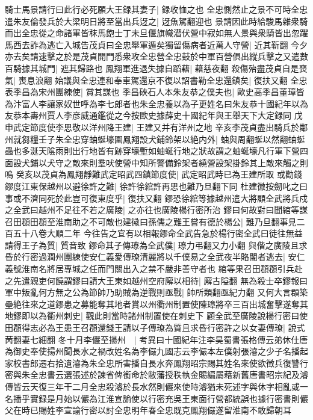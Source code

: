 騎士馬景請行曰此行必死願大王録其妻子|{
	録收恤之也}
全忠惻然止之景不可時全忠遣朱友倫發兵於大梁明日將至當出兵迓之|{
	迓魚駕翻迎也}
景請因此時給駿馬雜衆騎而出全忠從之命諸軍皆秣馬飽士丁未旦偃旗幟潜伏營中寂如無人景與衆騎皆出忽躍馬西去詐為逃亡入城告茂貞曰全忠舉軍遁矣獨留傷病者近萬人守營|{
	近其靳翻}
今夕亦去矣請速擊之於是茂貞開門悉衆攻全忠營全忠鼓於中軍百營俱出縱兵擊之又遣數百騎據其城門|{
	遮其歸路也}
鳳翔軍進退失據自蹈藉|{
	藉慈夜翻}
殺傷殆盡茂貞自是喪氣|{
	喪息浪翻}
始議與全忠連和奉車駕還京不復以詔書勒全忠還鎮矣|{
	復扶又翻}
全忠表季昌為宋州團練使|{
	賞其謀也}
季昌硤石人本朱友恭之僕夫也|{
	歐史高季昌董璋皆為汴富人李讓家奴世呼為李七郎者也朱全忠養以為子更姓名曰朱友恭十國紀年以為友恭本夀州賈人李彦威通鑑從之今按歐史據薛史十國紀年與王舉天下大定録同}
戊申武定節度使李思敬以洋州降王建|{
	王建又并有洋州之地}
辛亥李茂貞盡出騎兵於鄰州就芻糧壬子朱全忠穿蚰蜒壕圍鳳翔設犬鋪鈴架以絶内外|{
	蚰與周翻蜒以然翻蚰蜒蟲也多涎天隂雨則出行地皆有跡穿壕塹如蚰蜒行地之狀故謂之蚰蜒壕凡行軍下營四面設犬鋪以犬守之敵來則羣吠使營中知所警備鈴架者繞營設架掛鈴其上敵來觸之則嗚}
癸亥以茂貞為鳳翔靜難武定昭武四鎮節度使|{
	武定昭武時已為王建所取}
或勸錢鏐度江東保越州以避徐許之難|{
	徐許徐綰許再思也難乃旦翻下同}
杜建徽按劒叱之曰事或不濟同死於此豈可復東度乎|{
	復扶又翻}
鏐恐徐綰等據越州遣大將顧全武將兵戍之全武曰越州不足往不若之廣陵|{
	之亦往也廣陵楊行密所治}
鏐曰何故對曰聞綰等謀召田頵田頵至淮南助之不可敵也建徽曰孫儒之難王嘗有德於楊公|{
	難乃旦翻事見二百五十八卷大順二年}
今往告之宜有以相報鏐命全武告急於楊行密全武曰徒往無益請得王子為質|{
	質音致}
鏐命其子傳璙為全武僕|{
	璙力弔翻又力小翻}
與偕之廣陵且求昏於行密過潤州團練使安仁義愛傳璙清麗將以千僕易之全武夜半賂閽者逃去|{
	安仁義號淮南名將居專城之任而門關出入之禁不嚴非善守者也}
綰等果召田頵頵引兵赴之先遣親吏何饒謂鏐曰請大王東如越州空府廨以相待|{
	廨古隘翻}
無為殺士卒鏐報曰軍中叛亂何方無之公為節帥乃助賊為逆戰則亟戰|{
	帥所類翻亟紀力翻}
又何大言頵築壘絶往來之道鏐患之募能奪其地者賞以州衢州制置使陳璋將卒三百出城奮擊遂奪其地鏐即以為衢州刺史|{
	觀此則當時諸州制置使在刺史下}
顧全武至廣陵說楊行密曰使田頵得志必為王患王召頵還錢王請以子傳璙為質且求昏行密許之以女妻傳璙|{
	說式苪翻妻七細翻}
冬十月李儼至揚州　|{
	考異曰十國紀年注李昊蜀書張格傳云弟休仕唐為御史奉使揚州聞長水之禍改姓名為李儼九國志云李儼本左僕射張濬之少子名播起家校書郎遷右拾遺濬為朱全忠所害播自長水奔鳳翔昭宗賜其姓名來使欲徵兵復讐行密與朱全忠書云選張述於諫省俾銜命於敝藩授秩執金賜編屬藉新舊唐書昭宗紀及濬傳皆云天復三年干二月全忠殺濬於長水然則儼來使時濬猶未死述字與休字相亂或一名播乎實録是月始以儼為江淮宣諭使以行密充吳王東面行營都統誤也據行密書則儼父在時已賜姓李宣諭行密以討全忠明年春全忠既克鳳翔儼遂留淮南不敢歸朝耳}
